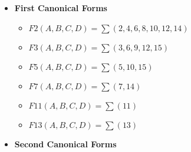 \begin{itemize}
\begin{itemize}
        \item $F7(A,B,C,D) =  (A+B+C+D) . (A+B+C+\bar D) . (A+B+\bar C+D) . (A+B+\bar C+\bar D) . (A+\bar B+C+D) . (A+\bar B+C+\bar D) . (A+\bar B+\bar C+D) . (\bar A+B+C+D) . (\bar A+B+C+\bar D) . (\bar A+B+\bar C+D) . (\bar A+B+\bar C+\bar D) . (\bar A+\bar B+C+D) . (\bar A+\bar B+C+\bar D) . (\bar A+\bar B+\bar C+\bar D)$
    
        \item $F11(A,B,C,D) =  (A+B+C+D) . (A+B+C+\bar D) . (A+B+\bar C+D) . (A+B+\bar C+\bar D) . (A+\bar B+C+D) . (A+\bar B+C+\bar D) . (A+\bar B+\bar C+D) . (A+\bar B+\bar C+\bar D) . (\bar A+B+C+D) . (\bar A+B+C+\bar D) . (\bar A+B+\bar C+D) . (\bar A+\bar B+C+D) . (\bar A+\bar B+C+\bar D) . (\bar A+\bar B+\bar C+D) . (\bar A+\bar B+\bar C+\bar D)$
    
        \item $F13(A,B,C,D) =  (A+B+C+D) . (A+B+C+\bar D) . (A+B+\bar C+D) . (A+B+\bar C+\bar D) . (A+\bar B+C+D) . (A+\bar B+C+\bar D) . (A+\bar B+\bar C+D) . (A+\bar B+\bar C+\bar D) . (\bar A+B+C+D) . (\bar A+B+C+\bar D) . (\bar A+B+\bar C+D) . (\bar A+B+\bar C+\bar D) . (\bar A+\bar B+C+D) . (\bar A+\bar B+\bar C+D) . (\bar A+\bar B+\bar C+\bar D)$
    
    \end{itemize}

\item \textbf{First Canonical Forms }
    \begin{itemize}
    
        \item $F2(A,B,C,D) = \sum(2, 4, 6, 8, 10, 12, 14)$
    
        \item $F3(A,B,C,D) = \sum(3, 6, 9, 12, 15)$
    
        \item $F5(A,B,C,D) = \sum(5, 10, 15)$
    
        \item $F7(A,B,C,D) = \sum(7, 14)$
    
        \item $F11(A,B,C,D) = \sum(11)$
    
        \item $F13(A,B,C,D) = \sum(13)$
    
    \end{itemize}

\item \textbf{Second Canonical Forms }
    \begin{itemize}
    

\end{itemize}
\end{itemize}
